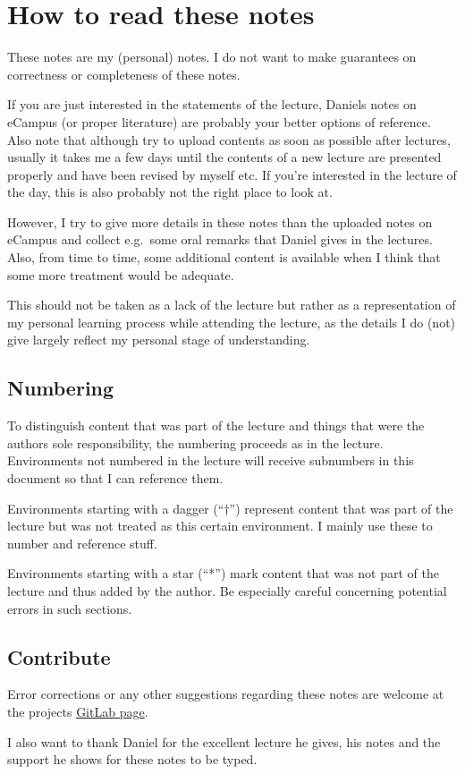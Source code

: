 \section{How to read these notes}
\label{sec:how-to-read}

These notes are my (personal) notes.
I do not want to make guarantees on correctness or completeness
of these notes.

If you are just interested in the statements of the lecture,
Daniels notes on eCampus (or proper literature)
are probably your better options of reference.
Also note that although try to upload contents as soon as possible
after lectures, usually it takes me a few days until the contents
of a new lecture are presented properly and have been revised by
myself etc.
If you're interested in the lecture of the day, this is also probably
not the right place to look at.

However, I try to give more details in these notes than the uploaded
notes on eCampus and collect e.g.~some oral remarks that Daniel gives
in the lectures.
Also, from time to time, some additional content is available when I
think that some more treatment would be adequate.

This should not be taken as a lack of the lecture but rather as
a representation of my personal learning process while attending the
lecture, as the details I do (not) give largely reflect my personal
stage of understanding.

\subsection*{Numbering}

To distinguish content that was part of the lecture and things that
were the authors sole responsibility, the numbering proceeds as in
the lecture.
Environments not numbered in the lecture will receive
subnumbers in this document so that I can reference them.

Environments starting with a dagger (\enquote{$\dagger$})
represent content that was part of the lecture but was not
treated as this certain environment.
I mainly use these to number and reference stuff.

Environments starting with a star (\enquote{*})
mark content that was not part of the lecture and thus added
by the author.
Be especially careful concerning potential errors in such sections.

\subsection*{Contribute}

Error corrections or any other suggestions regarding these notes are welcome
at the projects
\href{https://gitlab.com/latexci/lecture-notes-bonn/topology-2}
{GitLab page}.

I also want to thank Daniel for the excellent lecture he gives,
his notes and the support he shows for these notes to be typed.
